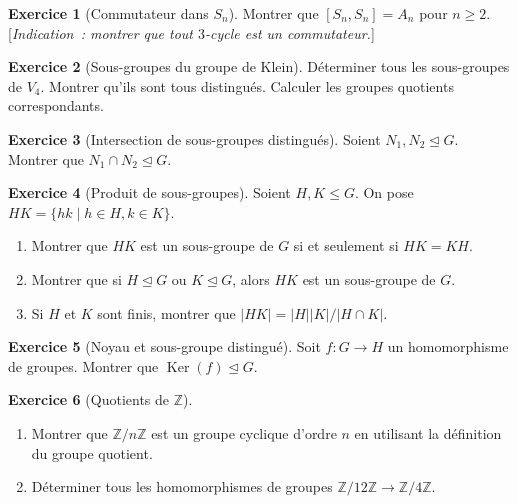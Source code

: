 \documentclass[12pt,a4paper,openany]{book}
\theoremstyle{definition}
\newtheorem{exercice}{Exercice}[chapter]
\newcommand{\Z}{\mathbb{Z}}
\DeclareMathOperator{\Ker}{Ker}
\newcommand{\normal}{\trianglelefteq}
\newcommand{\abs}[1]{\lvert #1 \rvert}
\begin{document}
\begin{exercice}[Commutateur dans $S_n$]
\label{exo:commutateur-Sn}
Montrer que $[S_n, S_n] = A_n$ pour $n \geq 2$. [\emph{Indication~: montrer que tout
$3$-cycle est un commutateur.}]
\end{exercice}

\begin{exercice}[Sous-groupes du groupe de Klein]
\label{exo:sg-V4}
Déterminer tous les sous-groupes de $V_4$. Montrer qu'ils sont tous distingués. Calculer
les groupes quotients correspondants.
\end{exercice}

\begin{exercice}[Intersection de sous-groupes distingués]
\label{exo:intersection-distingues}
Soient $N_1, N_2 \normal G$. Montrer que $N_1 \cap N_2 \normal G$.
\end{exercice}

\begin{exercice}[Produit de sous-groupes]
\label{exo:produit-sg}
Soient $H, K \leq G$. On pose $HK = \{hk \mid h \in H, k \in K\}$.
\begin{enumerate}[label=(\alph*)]
  \item Montrer que $HK$ est un sous-groupe de $G$ si et seulement si $HK = KH$.
  \item Montrer que si $H \normal G$ ou $K \normal G$, alors $HK$ est un sous-groupe
    de $G$.
  \item Si $H$ et $K$ sont finis, montrer que $\abs{HK} = \abs{H}\abs{K}/\abs{H \cap
    K}$.
\end{enumerate}
\end{exercice}

\begin{exercice}[Noyau et sous-groupe distingué]
\label{exo:noyau-distingue}
Soit $f : G \to H$ un homomorphisme de groupes. Montrer que $\Ker(f) \normal G$.
\end{exercice}

\begin{exercice}[Quotients de $\Z$]
\label{exo:quotients-Z}
\begin{enumerate}[label=(\alph*)]
  \item Montrer que $\Z/n\Z$ est un groupe cyclique d'ordre $n$ en utilisant la
    définition du groupe quotient.
  \item Déterminer tous les homomorphismes de groupes $\Z/12\Z \to \Z/4\Z$.
\end{enumerate}
\end{exercice}
\end{document}
